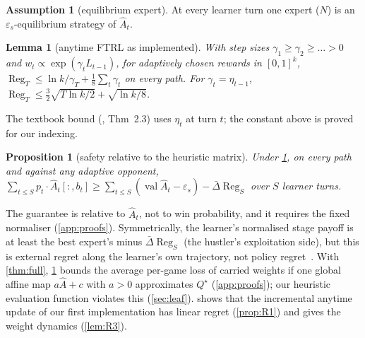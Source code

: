 \documentclass[10pt]{article}
\theoremstyle{plain}
\newtheorem{lemma}[theorem]{Lemma}
\newtheorem{proposition}[theorem]{Proposition}
\theoremstyle{definition}
\newtheorem{assumption}{Assumption}
\theoremstyle{remark}
\newcommand{\epss}{\varepsilon_s}
\newcommand{\Ahat}{\hat A}
\newcommand{\Qstar}{Q^\star}
\newcommand{\Dbar}{\bar\Delta}
\DeclareMathOperator{\val}{val}
\DeclareMathOperator{\Reg}{Reg}
\begin{document}
\begin{assumption}[equilibrium expert]\label{asm:E} At every learner turn one expert ($N$) is an $\epss$-equilibrium strategy of $\Ahat_t$.\end{assumption}

\begin{lemma}[anytime FTRL as implemented]\label{lem:R2}
With step sizes $\gamma_1\ge\gamma_2\ge\dots>0$ and $w_t\propto\exp(\gamma_tL_{t-1})$, for adaptively chosen rewards in $[0,1]^k$, $\Reg_T\le\ln k/\gamma_T+\frac18\sum_t\gamma_t$ on every path. For $\gamma_t=\eta_{t-1}$, $\Reg_T\le\tfrac32\sqrt{T\ln k/2}+\sqrt{\ln k/8}$.
\end{lemma}
The textbook bound (\cite{CBL06}, Thm~2.3) uses $\eta_t$ at turn $t$; the constant above is proved for our indexing.

\begin{proposition}[safety relative to the heuristic matrix]\label{prop:E1}
Under \cref{asm:E}, on every path and against any adaptive opponent, $\sum_{t\le S}p_t\cdot\Ahat_t[:,b_t]\ge\sum_{t\le S}(\val\Ahat_t-\epss)-\Dbar\Reg_S$ over $S$ learner turns.
\end{proposition}
The guarantee is relative to $\Ahat_t$, not to win probability, and it requires the fixed normaliser (\cref{app:proofs}). Symmetrically, the learner's normalised stage payoff is at least the best expert's minus $\Dbar\Reg_S$ (the hustler's exploitation side), but this is external regret along the learner's own trajectory, not policy regret~\cite{Aro12b}. With \cref{thm:full}, \cref{prop:E1} bounds the average per-game loss of carried weights if one global affine map $a\Ahat+c$ with $a>0$ approximates $\Qstar$ (\cref{app:proofs}); our heuristic evaluation function violates this (\cref{sec:leaf}).  shows that the incremental anytime update of our first implementation has linear regret (\cref{prop:R1}) and gives the weight dynamics (\cref{lem:R3}).
\end{document}
